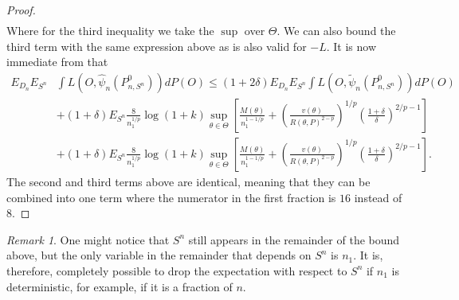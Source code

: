 \documentclass[11pt, a4paper]{article}
\theoremstyle{definition}
\theoremstyle{remark}
\newtheorem*{remark}{Remark}
\newcommand{\btheta}{\theta}
\newcommand{\la}{\psi}
\newcommand{\Sn}{S^n}
\begin{document}
\begin{proof}[Proof]
\begin{align*}
\end{align*}
Where for the third inequality we take the $ \sup $ over $ \Theta $. We can also bound the third term with the same expression above as  is also valid for $ -L $. It is now immediate from  that 
\begin{align*}
    E_{D_n} E_{\Sn} &\int L(O, \hat{\la}_n(P_{n, \Sn}^{0})) d P(O) \leq (1 + 2 \delta) E_{D_n} E_{\Sn} \int L(O, \tilde{\la}_n(P_{n, \Sn}^{0})) d P(O) \\
                    &+ (1 + \delta) E_{\Sn}\frac{8}{n_1^{1/p}} \log(1 + k) \sup_{\btheta \in \Theta} \left[ \frac{M(\btheta)}{n_1^{1-1/p}} + \left( \frac{v(\btheta)}{R(\btheta, P)^{2-p}} \right)^{1/p}\left( \frac{1 + \delta}{\delta}  \right)^{2/p-1} \right]\\
                    &+ (1 + \delta) E_{\Sn}\frac{8}{n_1^{1/p}} \log(1 + k) \sup_{\btheta \in \Theta} \left[ \frac{M(\btheta)}{n_1^{1-1/p}} + \left( \frac{v(\btheta)}{R(\btheta, P)^{2-p}} \right)^{1/p}\left( \frac{1 + \delta}{\delta}  \right)^{2/p-1} \right].
\end{align*}
The second and third terms above are identical, meaning that they can be combined into one term where the numerator in the first fraction is $ 16 $ instead of $ 8 $. 
\end{proof}

\begin{remark}
One might notice that $ \Sn $ still appears in the remainder of the bound above, but the only variable in the remainder that depends on $ \Sn $ is $ n_1 $. It is, therefore, completely possible to drop the expectation with respect to $ \Sn $ if $ n_1 $ is deterministic, for example, if it is a fraction of $ n $.  
\end{remark}
\end{document}
